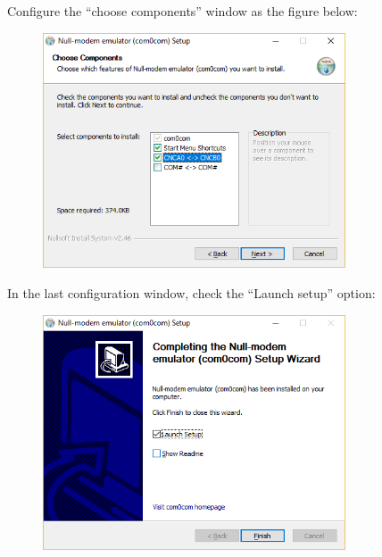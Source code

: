 Configure the ``choose components'' window as the figure below:
 \begin{figure}[H]
\center
\includegraphics[width=0.8\textwidth]{img/com0com1.png} 
\end{figure} 


In the last configuration window, check the ``Launch setup'' option:
\begin{figure}[H]
\center
\includegraphics[width=0.8\textwidth]{img/com0com2.png} 
\end{figure} 

